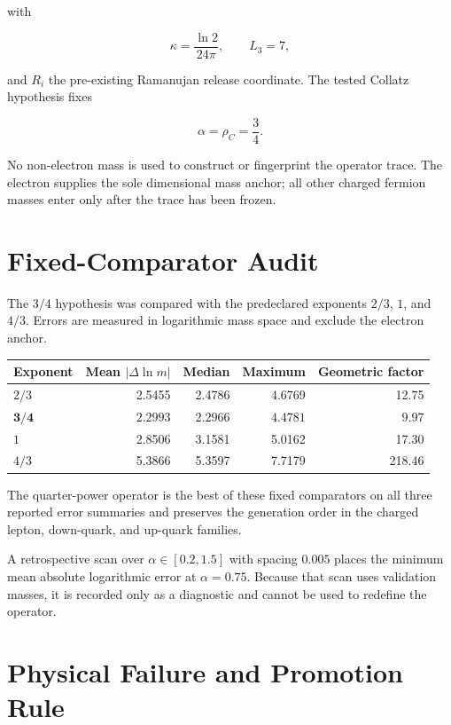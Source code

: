 with

\begin{equation}
\kappa=\frac{\ln2}{24\pi},
\qquad
L_3=7,
\end{equation}

and $R_i$ the pre-existing Ramanujan release coordinate.  The tested Collatz
hypothesis fixes

\begin{equation}
\alpha=\rho_C=\frac34.
\end{equation}

No non-electron mass is used to construct or fingerprint the operator trace.
The electron supplies the sole dimensional mass anchor; all other charged
fermion masses enter only after the trace has been frozen.

\section{Fixed-Comparator Audit}

The $3/4$ hypothesis was compared with the predeclared exponents $2/3$, $1$,
and $4/3$.  Errors are measured in logarithmic mass space and exclude the
electron anchor.

\begin{center}
\begin{tabular}{lrrrr}
\toprule
Exponent & Mean $|\Delta\ln m|$ & Median & Maximum & Geometric factor \\
\midrule
$2/3$ & 2.5455 & 2.4786 & 4.6769 & 12.75 \\
$\mathbf{3/4}$ & $\mathbf{2.2993}$ & $\mathbf{2.2966}$ & $\mathbf{4.4781}$ & $\mathbf{9.97}$ \\
$1$ & 2.8506 & 3.1581 & 5.0162 & 17.30 \\
$4/3$ & 5.3866 & 5.3597 & 7.7179 & 218.46 \\
\bottomrule
\end{tabular}
\end{center}

The quarter-power operator is the best of these fixed comparators on all three
reported error summaries and preserves the generation order in the charged
lepton, down-quark, and up-quark families.

A retrospective scan over $\alpha\in[0.2,1.5]$ with spacing $0.005$ places the
minimum mean absolute logarithmic error at $\alpha=0.75$.  Because that scan
uses validation masses, it is recorded only as a diagnostic and cannot be used
to redefine the operator.

\section{Physical Failure and Promotion Rule}

